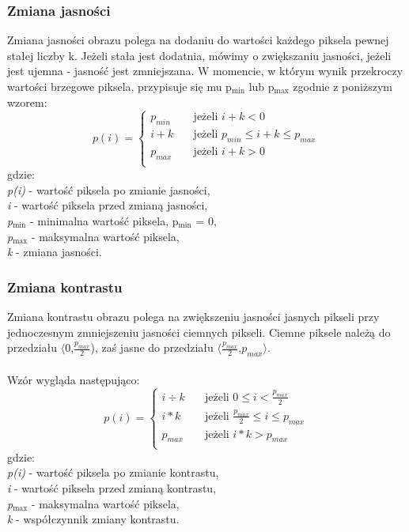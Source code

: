 \documentclass{classrep}
\begin{document}
\subsubsection{Zmiana jasności}
Zmiana jasności obrazu polega na dodaniu do wartości każdego piksela pewnej stałej liczby k. Jeżeli stała jest dodatnia, mówimy o zwiększaniu jasności, jeżeli jest ujemna - jasność jest zmniejszana. W momencie, w którym wynik przekroczy wartości brzegowe piksela, przypisuje się mu p$_{\text{min}}$ lub p$_{\text{max}}$ zgodnie z poniższym wzorem:
\[ p(i) =
  \begin{cases}
    p_{min} & \quad \text{jeżeli } i + k < 0\\
    i + k  & \quad \text{jeżeli } p_{min} \leq i+k \leq p_{max}\\
    p_{max}  & \quad \text{jeżeli } i + k > 0\\
  \end{cases}
\]
gdzie:\\
\textit{p(i)} - wartość piksela po zmianie jasności,\\
\textit{i} - wartość piksela przed zmianą jasności,\\
\textit{p$_{\text{min}}$} - minimalna wartość piksela, p$_{\text{min}}$ = 0,\\
\textit{p$_{\text{max}}$} - maksymalna wartość piksela,\\
\textit{k} - zmiana jasności.\\

\subsubsection{Zmiana kontrastu}
Zmiana kontrastu obrazu polega na zwiększeniu jasności jasnych pikseli przy jednoczesnym zmniejszeniu jasności ciemnych pikseli. Ciemne piksele należą do przedziału $\langle$0,$ \frac{p_{max}}{2}$), zaś jasne do przedziału $\langle$$ \frac{p_{max}}{2}$,$p_{max}$$\rangle$.\\
\\
Wzór wygląda następująco:
\[ p(i) =
  \begin{cases}
    i \div k  & \quad \text{jeżeli } 0 \leq i < \frac{p_{max}}{2}\\
    i \ast k  & \quad \text{jeżeli } \frac{p_{max}}{2} \leq i \leq p_{max}\\
    p_{max}  & \quad \text{jeżeli } i \ast k > p_{max}\\
  \end{cases}
\]
gdzie:\\
\textit{p(i)} - wartość piksela po zmianie kontrastu,\\
\textit{i} - wartość piksela przed zmianą kontrastu,\\
\textit{p$_{\text{max}}$} - maksymalna wartość piksela,\\
\textit{k} - współczynnik zmiany kontrastu.\\
\end{document}

